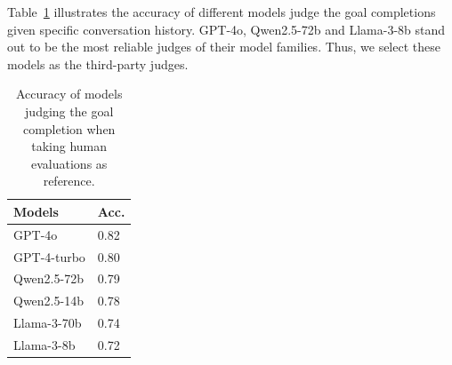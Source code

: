 Table~\ref{tab:human_eval} illustrates the accuracy of different models judge the goal completions given specific conversation history.
GPT-4o, Qwen2.5-72b and Llama-3-8b stand out to be the most reliable judges of their model families.
Thus, we select these models as the third-party judges.

\begin{table}
    \centering
    \begin{tabular}{@{}ll@{}}
        \toprule[1.1pt]
        Models              & Acc.   \\ \midrule[1.1pt]
        GPT-4o              & 0.82 \\
        GPT-4-turbo         & 0.80 \\
        Qwen2.5-72b         & 0.79 \\
        Qwen2.5-14b         & 0.78 \\
        Llama-3-70b & 0.74 \\
        Llama-3-8b  & 0.72 \\ \bottomrule[1.1pt]
    \end{tabular}
    \caption{Accuracy of models judging the goal completion when taking human evaluations as reference.}\label{tab:human_eval}
\end{table}